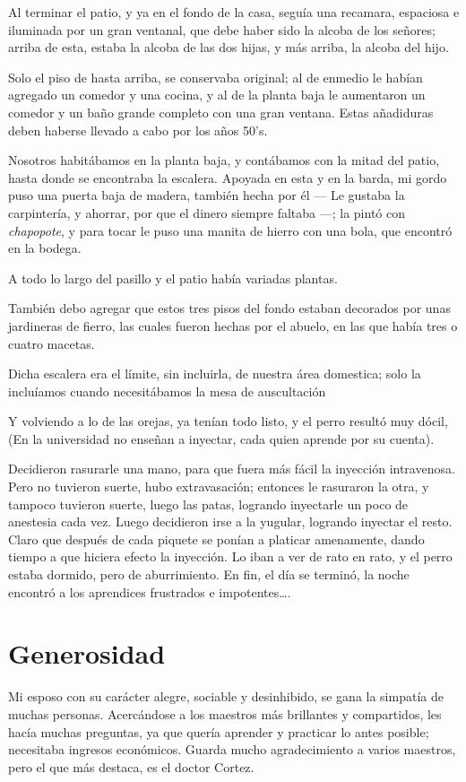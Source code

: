 \documentclass[letterpaper, 12pt]{book}
\begin{document}
Al terminar el patio, y ya en el fondo de la casa, seguía una recamara, espaciosa e iluminada por un gran ventanal, que debe haber sido la alcoba de los señores; arriba de esta, estaba la alcoba de las dos hijas, y más arriba, la alcoba del hijo.

Solo el piso de hasta arriba, se conservaba original; al de enmedio le habían agregado un comedor y una cocina, y al de la planta baja le aumentaron un comedor y un baño grande completo con una gran ventana. Estas añadiduras deben haberse llevado a cabo por los años 50's. 

Nosotros habitábamos en la planta baja, y contábamos con la mitad del patio, hasta donde se encontraba la escalera. Apoyada en esta y en la barda, mi gordo puso una puerta baja de madera, también hecha por él --- Le gustaba la carpintería, y ahorrar, por que el dinero siempre faltaba ---; la pintó con \textit{chapopote}, y para tocar le puso una manita de hierro con una bola, que encontró en la bodega.

A todo lo largo del pasillo y el patio había variadas plantas. 

También debo agregar que estos tres pisos del fondo estaban decorados por unas jardineras de fierro, las cuales fueron hechas por el abuelo, en las que había tres o cuatro macetas. 

Dicha escalera era el límite, sin incluirla, de nuestra área domestica; solo la incluíamos cuando necesitábamos la mesa de auscultación

Y volviendo a lo de las orejas, ya tenían todo listo, y el perro resultó muy dócil, (En la universidad no enseñan a inyectar, cada quien aprende por su cuenta).

Decidieron rasurarle una mano, para que fuera más fácil la inyección intravenosa. Pero no tuvieron suerte, hubo extravasación; entonces le rasuraron la otra, y tampoco tuvieron suerte, luego las patas, logrando inyectarle un poco de anestesia cada vez. Luego decidieron  irse a la yugular, logrando inyectar el resto. Claro que después de cada piquete se ponían a platicar amenamente, dando tiempo a que hiciera efecto la inyección. Lo iban a ver de rato en rato, y el perro estaba dormido, pero de aburrimiento. En fin, el día se terminó, la noche encontró a los aprendices frustrados e impotentes\ldots.

\chapter{Generosidad}
Mi esposo con su carácter alegre, sociable y desinhibido, se gana la simpatía de muchas personas. Acercándose a los maestros más brillantes y compartidos, les hacía muchas preguntas, ya que quería aprender y practicar lo antes posible; necesitaba ingresos económicos. Guarda mucho agradecimiento a varios maestros, pero el que más destaca, es el doctor Cortez.
\end{document}
